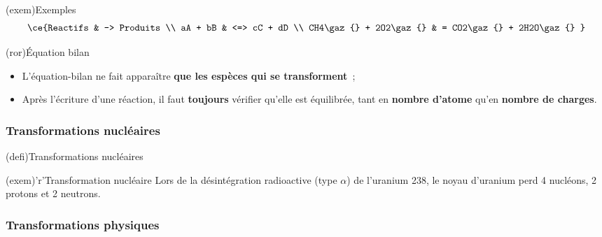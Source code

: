 \documentclass[../../main/main.tex]{subfiles}
\begin{document}
\begin{tcb}(exem){Exemples}
	\vspace{-15pt}
	\begin{align*}
		\ce{Reactifs          & -> Produits
		\\
		aA + bB               & <=> cC + dD
		\\
		CH4\gaz{} + 2O2\gaz{} & = CO2\gaz{} + 2H2O\gaz{}
		}
	\end{align*}
\end{tcb}

\begin{tcb}[label=rema:eqbil](ror){Équation bilan}
	\begin{itemize}
		\item L'équation-bilan ne fait apparaître \textbf{que les espèces qui se
			      transforment}~;
		\item Après l'écriture d'une réaction, il faut \textbf{toujours}
		      vérifier qu'elle est équilibrée, tant en \textbf{nombre d'atome}
		      qu'en \textbf{nombre de charges}.
	\end{itemize}
\end{tcb}

\subsubsection{Transformations nucléaires}

\begin{tcbraster}[raster columns=2, raster equal height=rows]
	\begin{tcb}[label=def:transnuc](defi){Transformations nucléaires}
	\end{tcb}
	\begin{tcb}[label=exem:transnuc](exem)'r'{Transformation nucléaire}
		Lors de la désintégration radioactive (type $\alpha$) de l'uranium 238,
		le noyau d'uranium perd 4 nucléons, 2 protons et 2 neutrons.
		\psw{
		\[
			\ce{^{238}_{92}U}
			\longrightarrow
			\ce{^{234}_{90}Th + ^{4}_{2}He}
		\]
		}
		\vspace{-15pt}
	\end{tcb}
\end{tcbraster}

\subsubsection{Transformations physiques}
\end{document}
